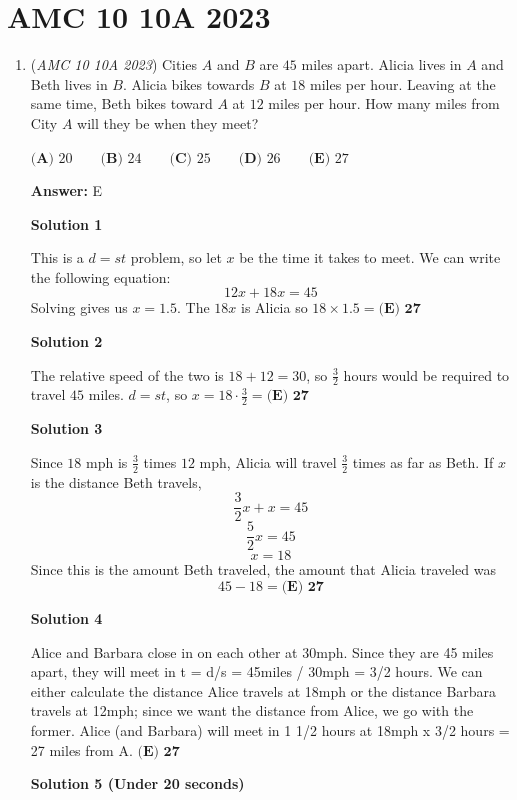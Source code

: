 \section{AMC 10 10A 2023}
        \begin{enumerate}
        	\item (\textit{AMC 10 10A 2023}) Cities $A$ and $B$ are $45$ miles apart. Alicia lives in $A$ and Beth lives in $B$. Alicia bikes towards $B$ at $18$ miles per hour. Leaving at the same time, Beth bikes toward $A$ at $12$ miles per hour. How many miles from City $A$ will they be when they meet?


 $\textbf{(A) }20\qquad\textbf{(B) }24\qquad\textbf{(C) }25\qquad\textbf{(D) }26\qquad\textbf{(E) }27$

 \textbf{Answer: }E



\textbf{Solution 1}

This is a $d=st$ problem, so let $x$ be the time it takes to meet. We can write the following equation:
 \[12x+18x=45\]Solving gives us $x=1.5$. The $18x$ is Alicia so $18\times1.5=\boxed{\textbf{(E) 27}}$




\textbf{Solution 2}

The relative speed of the two is $18+12=30$, so $\frac{3}{2}$ hours would be required to travel $45$ miles. $d=st$, so $x=18\cdot\frac{3}{2}=\boxed{\textbf{(E) 27}}$




\textbf{Solution 3}

Since $18$ mph is $\frac{3}{2}$ times $12$ mph, Alicia will travel $\frac{3}{2}$ times as far as Beth. If $x$ is the distance Beth travels, 
 \[\frac{3}{2}x+x=45\] 
 \[\frac{5}{2}x=45\] 
 \[x=18\]Since this is the amount Beth traveled, the amount that Alicia traveled was 
 \[45-18=\boxed{\textbf{(E) 27}}\]




\textbf{Solution 4}

Alice and Barbara close in on each other at 30mph. Since they are 45 miles apart, they will meet in t = d/s = 45miles / 30mph = 3/2 hours. We can either calculate the distance Alice travels at 18mph or the distance Barbara travels at 12mph; since we want the distance from Alice, we go with the former. Alice (and Barbara) will meet in 1 1/2 hours at 18mph x 3/2 hours = 27 miles from A. $\boxed{\textbf{(E) 27}}$




\textbf{Solution 5 (Under 20 seconds)}


\end{enumerate}

